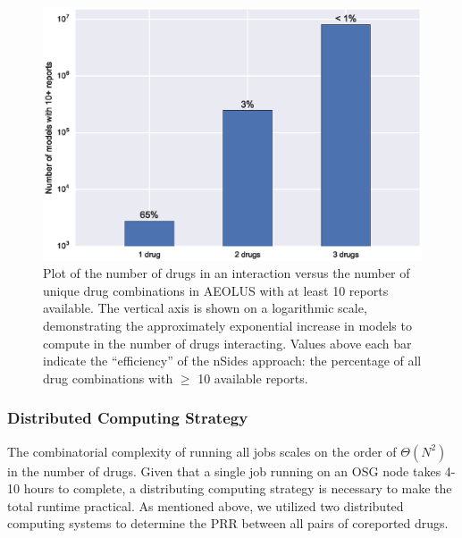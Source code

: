 \documentclass{ws-procs11x85}
\begin{document}
\begin{figure}[h]
\centerline{\includegraphics[width=5in, scale=0.7]{drug_interactions}}
\caption{Plot of the number of drugs in an interaction versus the number of unique drug combinations in AEOLUS with at least 10 reports available. The vertical axis is shown on a logarithmic scale, demonstrating the approximately exponential increase in models to compute in the number of drugs interacting. Values above each bar indicate the ``efficiency'' of the nSides approach: the percentage of all drug combinations with $\geq$ 10 available reports.}
\label{fig:drug_interactions}
\end{figure}

\subsubsection{Distributed Computing Strategy}
The combinatorial complexity of running all jobs scales on the order
of $\Theta(N^2)$ in the number of drugs. Given that a single job
running on an OSG node takes 4-10 hours to complete, a distributing
computing strategy is necessary to make the total runtime
practical. As mentioned above, we utilized two distributed computing systems to determine
the PRR between all pairs of coreported drugs.
\end{document}
